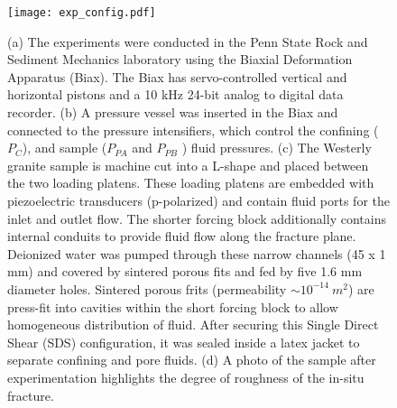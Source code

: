 \documentclass[letterpaper,10pt]{article}
\begin{document}
\begin{figure}[ht] 
	\centering 
	\texttt{[image: exp\_config.pdf]}
	\caption[]{(a) The experiments were conducted in the Penn State Rock and Sediment Mechanics laboratory using the Biaxial Deformation Apparatus (Biax). The Biax has servo-controlled vertical and horizontal pistons and a 10 kHz 24-bit analog to digital data recorder. (b) A pressure vessel was inserted in the Biax and connected to the pressure intensifiers, which control the confining ($P_C$), and sample ($P_{PA}$ and $P_{PB}$ ) fluid pressures. (c) The Westerly granite sample is machine cut into a L-shape and placed between the two loading platens. These loading platens are embedded with piezoelectric transducers (p-polarized) and contain fluid ports for the inlet and outlet flow. The shorter forcing block additionally contains internal conduits to provide fluid flow along the fracture plane. Deionized water was pumped through these narrow channels (45 x 1 mm) and covered by sintered porous fits and fed by five 1.6 mm diameter holes. Sintered porous frits (permeability $\sim 10^{-14}\ m^2$) are press-fit into cavities within the short forcing block to allow homogeneous distribution of fluid. After securing this Single Direct Shear (SDS) configuration, it was sealed inside a latex jacket to separate confining and pore fluids. (d) A photo of the sample after experimentation highlights the degree of roughness of the in-situ fracture.}
	\label{fig:samplesetup} 
\end{figure}

\newpage
\end{document}

